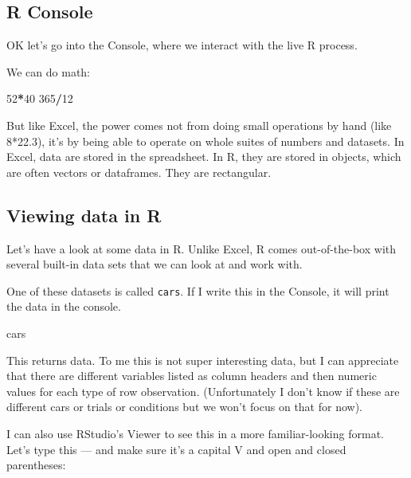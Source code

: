 \documentclass[]{book}
\newenvironment{Shaded}{\begin{snugshade}}{\end{snugshade}}
\newcommand{\DecValTok}[1]{\textcolor[rgb]{0.00,0.00,0.81}{#1}}
\newcommand{\NormalTok}[1]{#1}
\newcommand{\OperatorTok}[1]{\textcolor[rgb]{0.81,0.36,0.00}{\textbf{#1}}}
\begin{document}
\hypertarget{r-console}{%
\subsection{R Console}\label{r-console}}

OK let's go into the Console, where we interact with the live R process.

We can do math:

\begin{Shaded}
\begin{Highlighting}[]
\DecValTok{52}\OperatorTok{*}\DecValTok{40}
\DecValTok{365}\OperatorTok{/}\DecValTok{12}
\end{Highlighting}
\end{Shaded}

But like Excel, the power comes not from doing small operations by hand (like 8*22.3), it's by being able to operate on whole suites of numbers and datasets. In Excel, data are stored in the spreadsheet. In R, they are stored in objects, which are often vectors or dataframes. They are rectangular.

\hypertarget{viewing-data-in-r}{%
\subsection{Viewing data in R}\label{viewing-data-in-r}}

Let's have a look at some data in R. Unlike Excel, R comes out-of-the-box with several built-in data sets that we can look at and work with.

One of these datasets is called \texttt{cars}. If I write this in the Console, it will print the data in the console.

\begin{Shaded}
\begin{Highlighting}[]
\NormalTok{cars}
\end{Highlighting}
\end{Shaded}

This returns data. To me this is not super interesting data, but I can appreciate that there are different variables listed as column headers and then numeric values for each type of row observation. (Unfortunately I don't know if these are different cars or trials or conditions but we won't focus on that for now).

I can also use RStudio's Viewer to see this in a more familiar-looking format. Let's type this --- and make sure it's a capital V and open and closed parentheses:
\end{document}
